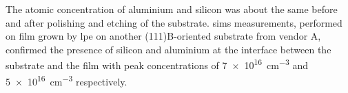 The atomic concentration of aluminium and silicon was about the same before and after polishing and etching of the substrate. \Ac{sims} measurements, performed on  film grown by \ac{lpe} on another (111)B-oriented substrate from vendor A, confirmed the presence of silicon and aluminium at the interface between the substrate and the film with peak concentrations of \SI{7e16}{\centi\metre^{-3}} and \SI{5e16}{\centi\metre^{-3}} respectively.


